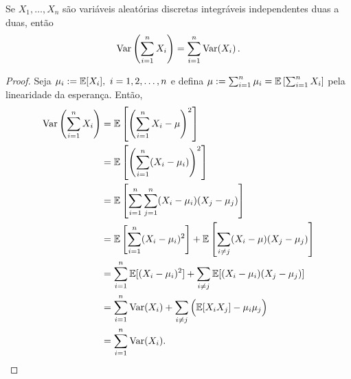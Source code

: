\begin{proposition}
Se $X_1, \dots, X_n$ são variáveis aleatórias discretas integráveis independentes duas a duas, então
\begin{equation}
\mathrm{Var}\left(\sum_{i=1}^{n}X_i\right) = \sum_{i=1}^{n} \mathrm{Var}(X_i) \,.
\end{equation}
\end{proposition}
\begin{proof}
Seja $\mu_i:=\mathbb{E}[X_i], \, \, i=1,2,\dots,n$ e defina 
$\mu:= \sum_{i=1}^{n}\mu_i= \mathbb{E}\left[\sum_{i=1}^{n}X_i\right]$ pela linearidade da esperança. Então,
\begin{align}
\mathrm{Var}\left(\sum_{i=1}^{n} X_i \right) &= \mathbb{E}\left[\left(\sum_{i=1}^{n}X_i- \mu\right)^2\right] \\
&= \mathbb{E}\left[\left(\sum_{i=1}^{n}(X_i- \mu_i)\right)^2\right] \\
&= \mathbb{E}\left[ \sum_{i=1}^{n} \sum_{j=1}^{n} (X_i-\mu_i)(X_j-\mu_j) \right] \\
&= \mathbb{E}\left[\sum_{i=1}^{n}(X_i-\mu_i)^2\right] + \mathbb{E}\left[\sum_{i \neq j}(X_i-\mu)(X_j-\mu_j)\right] \\
&= \sum_{i=1}^{n} \mathbb{E}[(X_i-\mu_i)^2]+\sum_{i \neq j}\mathbb{E}[(X_i-\mu_i)(X_j-\mu_j)] \\
&= \sum_{i=1}^{n} \text{Var}(X_i) + \sum_{i \neq j} \Big( \mathbb{E}[X_i X_j] - \mu_i \mu_j \Big) \\
&= \sum_{i=1}^{n} \text{Var}(X_i).
\qedhere
\end{align}
\end{proof}

